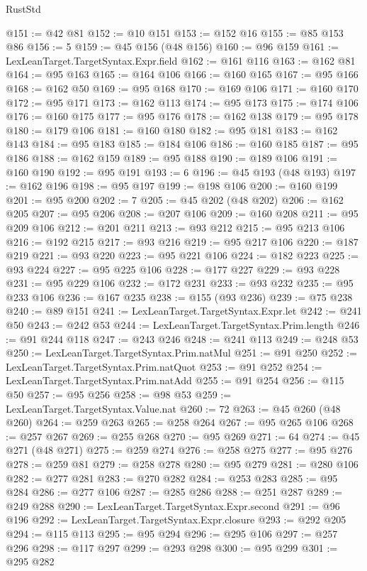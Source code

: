 \begin{lexlean}{RustStd}
\begin{coremodule}
{\begin{coremodule}
{{{{{{{{{{{{{{{{{{{{{{{{{{{{{{{{{{{{{{{@151 := @42 @81
@152 := @10 @151
@153 := @152 @16
@155 := @85 @153 @86
@156 := 5
@159 := @45 @156 (@48 @156)
@160 := @96 @159
@161 := LexLeanTarget.TargetSyntax.Expr.field
@162 := @161 @116
@163 := @162 @81
@164 := @95 @163
@165 := @164 @106
@166 := @160 @165
@167 := @95 @166
@168 := @162 @50
@169 := @95 @168
@170 := @169 @106
@171 := @160 @170
@172 := @95 @171
@173 := @162 @113
@174 := @95 @173
@175 := @174 @106
@176 := @160 @175
@177 := @95 @176
@178 := @162 @138
@179 := @95 @178
@180 := @179 @106
@181 := @160 @180
@182 := @95 @181
@183 := @162 @143
@184 := @95 @183
@185 := @184 @106
@186 := @160 @185
@187 := @95 @186
@188 := @162 @159
@189 := @95 @188
@190 := @189 @106
@191 := @160 @190
@192 := @95 @191
@193 := 6
@196 := @45 @193 (@48 @193)
@197 := @162 @196
@198 := @95 @197
@199 := @198 @106
@200 := @160 @199
@201 := @95 @200
@202 := 7
@205 := @45 @202 (@48 @202)
@206 := @162 @205
@207 := @95 @206
@208 := @207 @106
@209 := @160 @208
@211 := @95 @209 @106
@212 := @201 @211
@213 := @93 @212
@215 := @95 @213 @106
@216 := @192 @215
@217 := @93 @216
@219 := @95 @217 @106
@220 := @187 @219
@221 := @93 @220
@223 := @95 @221 @106
@224 := @182 @223
@225 := @93 @224
@227 := @95 @225 @106
@228 := @177 @227
@229 := @93 @228
@231 := @95 @229 @106
@232 := @172 @231
@233 := @93 @232
@235 := @95 @233 @106
@236 := @167 @235
@238 := @155 (@93 @236)
@239 := @75 @238
@240 := @89 @151
@241 := LexLeanTarget.TargetSyntax.Expr.let
@242 := @241 @50
@243 := @242 @53
@244 := LexLeanTarget.TargetSyntax.Prim.length
@246 := @91 @244 @118
@247 := @243 @246
@248 := @241 @113
@249 := @248 @53
@250 := LexLeanTarget.TargetSyntax.Prim.natMul
@251 := @91 @250
@252 := LexLeanTarget.TargetSyntax.Prim.natQuot
@253 := @91 @252
@254 := LexLeanTarget.TargetSyntax.Prim.natAdd
@255 := @91 @254
@256 := @115 @50
@257 := @95 @256
@258 := @98 @53
@259 := LexLeanTarget.TargetSyntax.Value.nat
@260 := 72
@263 := @45 @260 (@48 @260)
@264 := @259 @263
@265 := @258 @264
@267 := @95 @265 @106
@268 := @257 @267
@269 := @255 @268
@270 := @95 @269
@271 := 64
@274 := @45 @271 (@48 @271)
@275 := @259 @274
@276 := @258 @275
@277 := @95 @276
@278 := @259 @81
@279 := @258 @278
@280 := @95 @279
@281 := @280 @106
@282 := @277 @281
@283 := @270 @282
@284 := @253 @283
@285 := @95 @284
@286 := @277 @106
@287 := @285 @286
@288 := @251 @287
@289 := @249 @288
@290 := LexLeanTarget.TargetSyntax.Expr.second
@291 := @96 @196
@292 := LexLeanTarget.TargetSyntax.Expr.closure
@293 := @292 @205
@294 := @115 @113
@295 := @95 @294
@296 := @295 @106
@297 := @257 @296
@298 := @117 @297
@299 := @293 @298
@300 := @95 @299
@301 := @295 @282
}}}}}}}}}}}}}}}}}}}}}}}}}}}}}}}}}}}}}}}
\end{coremodule}}
\end{coremodule}
\end{lexlean}
